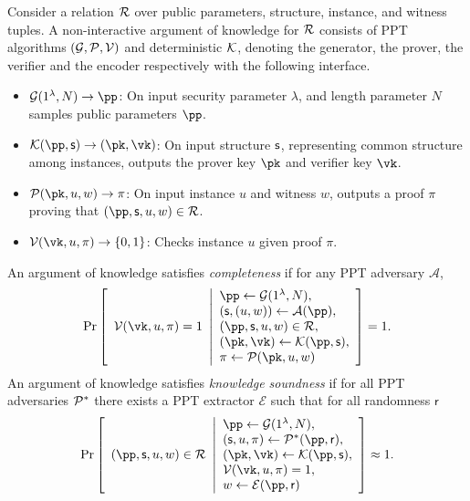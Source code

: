 \begin{definition}\label{def:nark}
   Consider a relation $\mathcal{R}$ over 
   public parameters, structure, instance, and witness tuples.
   A non-interactive argument of knowledge for $\mathcal{R}$ consists of PPT algorithms
   $(\mathcal{G}, \mathcal{P},\mathcal{V})$ 
   and deterministic $\mathcal{K}$,
   denoting the generator, 
   the prover,    
   the verifier
   and the encoder respectively with the following interface.
   \begin{itemize}
       \item $\Gn(1^{\lambda}, N) \to \pp$: 
       On input security parameter $\lambda$,
       and length parameter $N$
       samples public parameters $\pp$.
       \item $\En(\pp, \Str) \to (\pk, \vk)$: 
       On input structure $\mathsf{s}$, 
       representing common structure among instances,
       outputs the prover key $\pk$ and verifier key $\vk$.
       \item $\Po(\pk, u, w) \to \pi$: On input instance $u$ and
         witness $w$, outputs a proof $\pi$ proving that $(\pp, \Str, u, w) \in \R$.
       \item $\V(\vk, u, \pi) \to \{0, 1\}$: 
       Checks instance $u$ 
       given proof $\pi$.
   \end{itemize}
   An argument of knowledge satisfies \textit{completeness} if for any PPT adversary $\mathcal{A}$,
   \begin{align*}
   \Pr
   \left[
       \begin{array}{l}
       \V(\vk, u, \pi) = 1
       \end{array}
       \middle\vert
       \begin{array}{l}
       \pp \gets \Gn(1^{\lambda}, N),\\
       (\Str,(u, w)) \gets \mathcal{A}(\pp),\\
       (\pp, \Str, u, w) \in \R,\\
       (\pk, \vk) \gets \En(\pp, \Str),\\
       \pi \gets \Po(\pk, u, w)
       \end{array}
       \right]
   = 1.
   \end{align*}
   An argument of knowledge satisfies \textit{knowledge soundness} if for all PPT adversaries $\mathcal{P}^*$ there exists a PPT extractor $\mathcal{E}$ such that for all randomness $\mathsf{r}$
   \[
   \Pr
   \left[
       \begin{array}{l}
       (\pp, \Str, u, w) \in \R
       \end{array}
       \middle\vert
       \begin{array}{l}
       \pp \gets \Gn(1^{\lambda}, N),\\
       (\Str,u,\pi) \gets \Po^*(\pp, \mathsf{r}),\\
       (\pk, \vk) \gets \En(\pp, \Str),\\
       \V(\vk, u, \pi) = 1,\\
       w \gets \mathcal{E}(\pp, \mathsf{r})
       \end{array}
       \right]
   \approx 1.
   \]
\end{definition}

